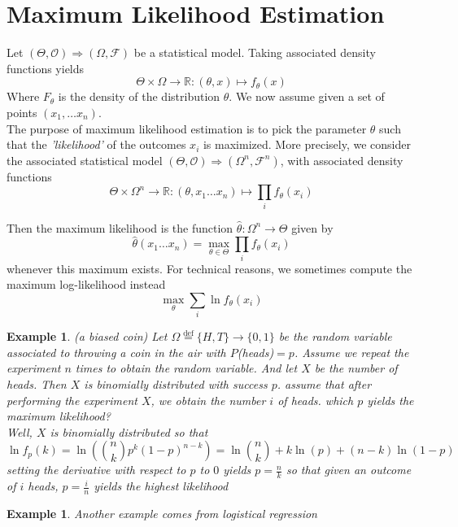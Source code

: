 \documentclass{book}
\theoremstyle{plain}
\newtheorem{example}[corollary]{Example}
\theoremstyle{definition}
\renewcommand{\d}[1]{\mathbb{#1}}
\newcommand{\define}{\stackrel{\operatorname{def}}{=}}
\newcommand{\fun}{\mapsto}
\newcommand{\mor}{\longrightarrow}
\renewcommand{\r}[1]{\mathcal{#1}}
\begin{document}
\section{Maximum Likelihood Estimation}
Let $(\Theta, \r{O})\Longrightarrow (\Omega, \r{F})$ be a statistical model. Taking associated density functions yields
\[
\Theta\times \Omega \mor \d{R}:(\theta,x)\fun f_\theta(x)
\]
Where $F_\theta$ is the density of the distribution $\theta$. We now assume given a set of points $(x_1,\ldots x_n)$.\\ The purpose of maximum likelihood estimation is to pick the parameter $\theta$ such that the \emph{'likelihood'} of the outcomes $x_i$ is maximized. More precisely, we consider the associated statistical model $(\Theta,\r{O})\Longrightarrow (\Omega^n,\r{F}^n)$, with associated density functions
\[
\Theta\times \Omega^n\mor \d{R}:(\theta,x_1\ldots x_n)\fun \prod_i f_\theta(x_i)
\]


Then the maximum likelihood is the function $\hat{\theta}:\Omega^n\mor \Theta$ given by
\[
\hat{\theta}(x_1\ldots x_n)=\max_{\theta\in \Theta} \prod_i f_\theta(x_i)
\]
whenever this maximum exists. For technical reasons, we sometimes compute the maximum  log-likelihood instead
\[
\max_\theta \sum_i \ln f_\theta(x_i)
\]

\begin{example} (a biased coin)
Let $\Omega\define\{H,T\}\mor\{0,1\}$ be the random variable associated to throwing a coin in the air with $P$(heads)$=p$. Assume we repeat the experiment $n$ times to obtain the random variable. And let $X$ be the number of heads. Then $X$ is binomially distributed with success $p$. assume that after performing the experiment $X$, we obtain the number $i$ of heads. which $p$ yields the maximum likelihood?\\
Well, $X$ is binomially distributed so that
\[
\ln f_p(k)=\ln(\binom{n}{k}p^k(1-p)^{n-k})=\ln\binom{n}{k}+k\ln(p)+(n-k)\ln(1-p) 
\]
setting the derivative with respect to $p$ to $0$ yields $p=\frac{n}{k}$ so that given an outcome of $i$ heads, $p=\frac{i}{n}$ yields the highest likelihood
\end{example}

\begin{example}
Another example comes from logistical regression	
\end{example}
\end{document}
